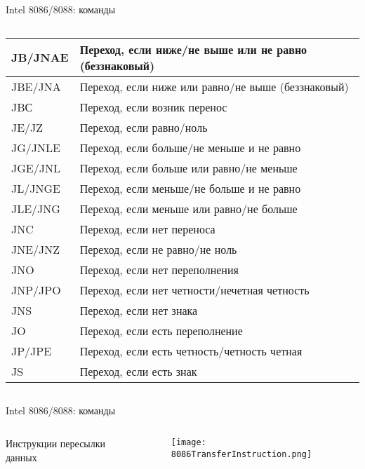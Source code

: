 \documentclass[aspectratio=169,14pt]{beamer}
\begin{document}
\begin{frame}{Intel 8086/8088: команды}
\begin{columns}[t,onlytextwidth]
\begin{column}{0.5\textwidth}
\begin{tiny}
\begin{tabular}{|p{0.9cm}|p{5.4cm}|}
                JB/JNAE & Переход, если ниже/не выше или не равно (беззнаковый)\\ \hline
                JBE/JNA & Переход, если ниже или равно/не выше (беззнаковый)\\ \hline
                JBС & Переход, если возник перенос\\ \hline
                JE/JZ & Переход, если равно/ноль\\ \hline
                JG/JNLE & Переход, если больше/не меньше и не равно\\ \hline
                JGE/JNL & Переход, если больше или равно/не меньше\\ \hline
                JL/JNGE & Переход, если меньше/не больше и не равно\\ \hline
                JLE/JNG & Переход, если меньше или равно/не больше\\ \hline
                JNC & Переход, если нет переноса\\ \hline
                JNE/JNZ & Переход, если не равно/не ноль\\ \hline
                JNO & Переход, если нет переполнения\\ \hline
                JNP/JPO & Переход, если нет четности/нечетная четность\\ \hline
                JNS & Переход, если нет знака\\ \hline
                JO & Переход, если есть переполнение\\ \hline
                JP/JPE & Переход, если есть четность/четность четная\\ \hline
                JS & Переход, если есть знак\\ \hline
            \end{tabular}
            \end{tiny}
        \end{column}
    \end{columns}
\end{frame}

\begin{frame}{Intel 8086/8088: команды}
    \begin{columns}[t,onlytextwidth]
        \begin{column}{0.5\textwidth}
            Инструкции пересылки данных
        \end{column}
        \begin{column}{0.5\textwidth}
            \begin{figure}[р]
                \centering
                \texttt{[image: 8086TransferInstruction.png]}
            \end{figure}
        \end{column}
    \end{columns}
\end{frame}
\end{document}
